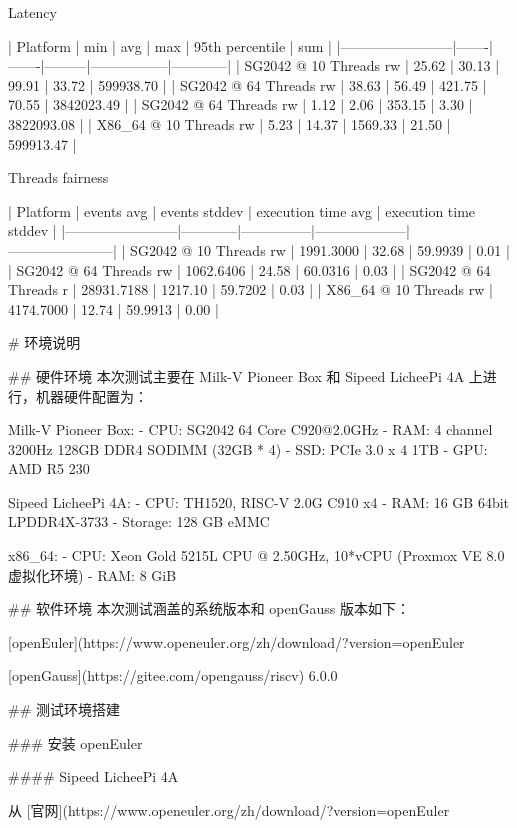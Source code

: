 \documentclass{article}
\begin{document}
\begin{markdown}
Latency

| Platform               | min   | avg   | max     | 95th percentile | sum        |
|------------------------|-------|-------|---------|-----------------|------------|
| SG2042 @ 10 Threads rw | 25.62 | 30.13 | 99.91   | 33.72           | 599938.70  |
| SG2042 @ 64 Threads rw | 38.63 | 56.49 | 421.75  | 70.55           | 3842023.49 |
| SG2042 @ 64 Threads rw | 1.12  | 2.06  | 353.15  | 3.30            | 3822093.08 |
| X86_64 @ 10 Threads rw | 5.23  | 14.37 | 1569.33 | 21.50           | 599913.47  |


Threads fairness

| Platform               | events avg | events stddev | execution time avg | execution time stddev |
|------------------------|------------|---------------|--------------------|-----------------------|
| SG2042 @ 10 Threads rw | 1991.3000  | 32.68         | 59.9939            | 0.01                  |
| SG2042 @ 64 Threads rw | 1062.6406  | 24.58         | 60.0316            | 0.03                  |
| SG2042 @ 64 Threads r  | 28931.7188 | 1217.10       | 59.7202            | 0.03                  |
| X86_64 @ 10 Threads rw | 4174.7000  | 12.74         | 59.9913            | 0.00                  |


# 环境说明

## 硬件环境
本次测试主要在 Milk-V Pioneer Box 和 Sipeed LicheePi 4A 上进行，机器硬件配置为：

Milk-V Pioneer Box:
- CPU: SG2042 64 Core C920@2.0GHz
- RAM: 4 channel 3200Hz 128GB DDR4 SODIMM (32GB * 4)
- SSD: PCIe 3.0 x 4 1TB
- GPU: AMD R5 230

Sipeed LicheePi 4A:
- CPU: TH1520, RISC-V 2.0G C910 x4
- RAM: 16 GB 64bit LPDDR4X-3733
- Storage: 128 GB eMMC

x86\_64:
- CPU: Xeon Gold 5215L CPU @ 2.50GHz, 10*vCPU (Proxmox VE 8.0 虚拟化环境)
- RAM: 8 GiB

## 软件环境
本次测试涵盖的系统版本和 openGauss 版本如下：

[openEuler](https://www.openeuler.org/zh/download/?version=openEuler%

[openGauss](https://gitee.com/opengauss/riscv) 6.0.0

## 测试环境搭建

### 安装 openEuler

#### Sipeed LicheePi 4A

从 [官网](https://www.openeuler.org/zh/download/?version=openEuler%


\end{markdown}
\end{document}
